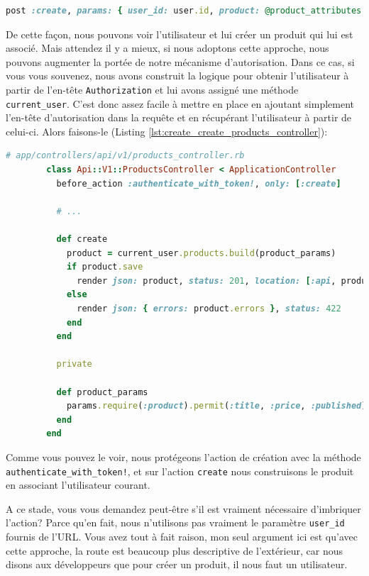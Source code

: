 \documentclass[]{report}
\begin{document}
      \begin{scriptsize}
        \begin{lstlisting}[language=ruby]
        post :create, params: { user_id: user.id, product: @product_attributes }
        \end{lstlisting}
      \end{scriptsize}

      De cette façon, nous pouvons voir l'utilisateur et lui créer un produit qui lui est associé. Mais attendez il y a mieux, si nous adoptons cette approche, nous pouvons augmenter la portée de notre mécanisme d'autorisation. Dans ce cas, si vous vous souvenez, nous avons construit la logique pour obtenir l'utilisateur à partir de l'en-tête \verb|Authorization| et lui avons assigné une méthode \verb|current_user|. C'est donc assez facile à mettre en place en ajoutant simplement l'en-tête d'autorisation dans la requête et en récupérant l'utilisateur à partir de celui-ci. Alors faisons-le (Listing \ref{lst:create_create_products_controller}):

      \begin{scriptsize}
        \begin{lstlisting}[language=ruby, caption={Méthode de création des produits}, label={lst:create_create_products_controller}]
        # app/controllers/api/v1/products_controller.rb
        class Api::V1::ProductsController < ApplicationController
          before_action :authenticate_with_token!, only: [:create]

          # ...

          def create
            product = current_user.products.build(product_params)
            if product.save
              render json: product, status: 201, location: [:api, product]
            else
              render json: { errors: product.errors }, status: 422
            end
          end

          private

          def product_params
            params.require(:product).permit(:title, :price, :published)
          end
        end
        \end{lstlisting}
      \end{scriptsize}

      Comme vous pouvez le voir, nous protégeons l'action de création avec la méthode \verb|authenticate_with_token!|, et sur l'action \verb|create| nous construisons le produit en associant  l'utilisateur courant.

      A ce stade, vous vous demandez peut-être s'il est vraiment nécessaire d'imbriquer l'action? Parce qu'en fait, nous n'utilisons pas vraiment le paramètre \verb|user_id| fournis de l'URL. Vous avez tout à fait raison, mon seul argument ici est qu'avec cette approche, la route est beaucoup plus descriptive de l'extérieur, car nous disons aux développeurs que pour créer un produit, il nous faut un utilisateur.
\end{document}
